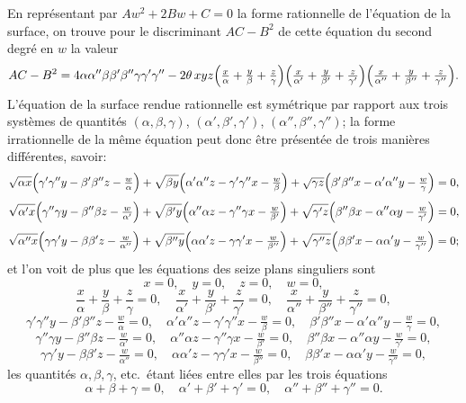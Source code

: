 \documentclass[11pt,a4paper]{article}
\begin{document}
\medskip

En repr\'esentant par $A w^2 + 2 B w + C = 0$ la forme rationnelle de l'\'equation de la
surface, on trouve pour le discriminant $AC - B^2$ de cette \'equation du second degr\'e
en $w$ la valeur
\[
AC - B^2 = 4\alpha\alpha''\beta\beta'\beta''\gamma\gamma'\gamma''
- 2 \theta\,xyz \Bigl(\tfrac{x}{\alpha} + \tfrac{y}{\beta} + \tfrac{z}{\gamma}\Bigr)
   \Bigl(\tfrac{x}{\alpha'} + \tfrac{y}{\beta'} + \tfrac{z}{\gamma'}\Bigr)
   \Bigl(\tfrac{x}{\alpha''} + \tfrac{y}{\beta''} + \tfrac{z}{\gamma''}\Bigr).
\]
L'\'equation de la surface rendue rationnelle est sym\'etrique par rapport aux trois
syst\`emes de quantit\'es $(\alpha, \beta, \gamma)$, $(\alpha', \beta', \gamma')$,
$(\alpha'', \beta'', \gamma'')$; la forme irrationnelle de la m\^eme \'equation peut donc
\^etre pr\'esent\'ee de trois mani\`eres diff\'erentes, savoir:
\[
\sqrt{\alpha x}\Bigl(\gamma'\gamma''y - \beta'\beta''z - \tfrac{w}{\alpha}\Bigr)
+ \sqrt{\beta y}\Bigl(\alpha'\alpha''z - \gamma'\gamma''x - \tfrac{w}{\beta}\Bigr)
+ \sqrt{\gamma z}\Bigl(\beta'\beta''x - \alpha'\alpha''y - \tfrac{w}{\gamma}\Bigr) = 0,
\]
\[
\sqrt{\alpha' x}\Bigl(\gamma''\gamma y - \beta''\beta z - \tfrac{w}{\alpha'}\Bigr)
+ \sqrt{\beta' y}\Bigl(\alpha''\alpha z - \gamma''\gamma x - \tfrac{w}{\beta'}\Bigr)
+ \sqrt{\gamma' z}\Bigl(\beta''\beta x - \alpha''\alpha y - \tfrac{w}{\gamma'}\Bigr) = 0,
\]
\[
\sqrt{\alpha'' x}\Bigl(\gamma\gamma' y - \beta\beta' z - \tfrac{w}{\alpha''}\Bigr)
+ \sqrt{\beta'' y}\Bigl(\alpha\alpha' z - \gamma\gamma' x - \tfrac{w}{\beta''}\Bigr)
+ \sqrt{\gamma'' z}\Bigl(\beta\beta' x - \alpha\alpha' y - \tfrac{w}{\gamma''}\Bigr) = 0;
\]
et l'on voit de plus que les \'equations des seize plans singuliers sont
\[
x = 0,\quad y = 0,\quad z = 0,\quad w = 0,
\]
\[
\frac{x}{\alpha} + \frac{y}{\beta} + \frac{z}{\gamma} = 0,\quad
\frac{x}{\alpha'} + \frac{y}{\beta'} + \frac{z}{\gamma'} = 0,\quad
\frac{x}{\alpha''} + \frac{y}{\beta''} + \frac{z}{\gamma''} = 0,
\]
\[
\gamma'\gamma'' y - \beta'\beta'' z - \tfrac{w}{\alpha} = 0,\quad
\alpha'\alpha'' z - \gamma'\gamma'' x - \tfrac{w}{\beta} = 0,\quad
\beta'\beta'' x - \alpha'\alpha'' y - \tfrac{w}{\gamma} = 0,
\]
\[
\gamma''\gamma y - \beta''\beta z - \tfrac{w}{\alpha'} = 0,\quad
\alpha''\alpha z - \gamma''\gamma x - \tfrac{w}{\beta'} = 0,\quad
\beta''\beta x - \alpha''\alpha y - \tfrac{w}{\gamma'} = 0,
\]
\[
\gamma\gamma' y - \beta\beta' z - \tfrac{w}{\alpha''} = 0,\quad
\alpha\alpha' z - \gamma\gamma' x - \tfrac{w}{\beta''} = 0,\quad
\beta\beta' x - \alpha\alpha' y - \tfrac{w}{\gamma''} = 0,
\]
les quantit\'es $\alpha, \beta, \gamma$, etc.\ \'etant li\'ees entre elles par les trois
\'equations
\[
\alpha + \beta + \gamma = 0,\quad \alpha' + \beta' + \gamma' = 0,\quad \alpha'' + \beta'' + \gamma'' = 0.
\]
\end{document}
